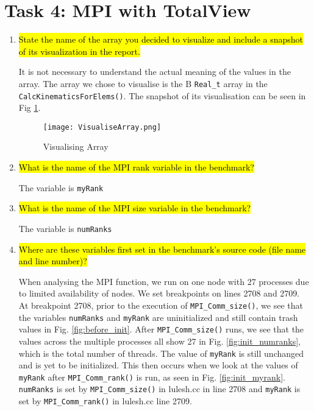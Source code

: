 \documentclass{article}
\begin{document}
\section{Task 4: MPI with TotalView}
\begin{enumerate}
	\item \hl{State the name of the array you decided to visualize and include a snapshot of its visualization in the report.}
	
	It is not necessary to understand the actual meaning of the values in the array.
	The array we chose to visualise is the B \verb!Real_t! array in the \verb!CalcKinematicsForElems()!. 
	The snapshot of its visualisation can be seen in Fig \ref{fig:visual_array}.
	
	\begin{figure}[p] %
		\begin{center}
			\texttt{[image: VisualiseArray.png]}
		\caption{Visualising Array}
		\label{fig:visual_array}
		\end{center}
	\end{figure}
	
	\item \hl{What is the name of the MPI rank variable in the benchmark?}
	
	The variable is \verb!myRank!
	\item \hl{What is the name of the MPI size variable in the benchmark?}
	
	The variable is \verb!numRanks!
	\item \hl{Where are these variables first set in the benchmark’s source code (file name and line number)?}
	
	When analysing the MPI function, we run on one node with 27 processes due to limited availability of nodes.
	We set breakpoints on lines 2708 and 2709. At breakpoint 2708, prior to the execution of \verb!MPI_Comm_size()!, we see that the variables \verb!numRanks! and \verb!myRank! are uninitialized and still contain trash values in Fig. \ref{fig:before_init}. 
	After \verb!MPI_Comm_size()! runs, we see that the values across the multiple processes all show 27 in Fig. \ref{fig:init_numranks}, which is the total number of threads. 
	The value of \verb!myRank! is still unchanged and is yet to be initialized. This then occurs when we look at the values of \verb!myRank! after \verb!MPI_Comm_rank()! is run, as seen in Fig. \ref{fig:init_myrank}. 
	\verb!numRanks! is set by \verb!MPI_Comm_size()! in lulesh.cc in line 2708 and \verb!myRank! is set by \verb!MPI_Comm_rank()! in lulesh.cc line 2709. 
	

\end{enumerate}
\end{document}
